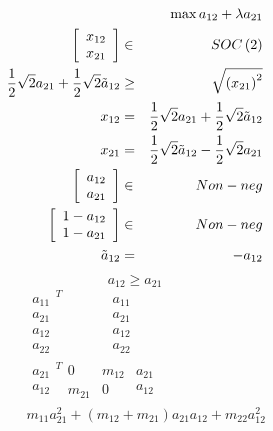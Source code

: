 \documentclass{article}
\begin{document}
\begin{eqnarray*}
&&\max a_{12}+\lambda a_{21} \\
\left[ 
\begin{array}{c}
x_{12} \\ 
x_{21}%
\end{array}%
\right]  &\in &SOC\left( 2\right)  \\
\frac{1}{2}\sqrt{2}a_{21}+\frac{1}{2}\sqrt{2}\tilde{a}_{12} &\geq &\sqrt{%
\left( x_{21}\right) ^{2}} \\
x_{12} &=&\frac{1}{2}\sqrt{2}a_{21}+\frac{1}{2}\sqrt{2}\tilde{a}_{12} \\
x_{21} &=&\frac{1}{2}\sqrt{2}\tilde{a}_{12}-\frac{1}{2}\sqrt{2}a_{21} \\
\left[ 
\begin{array}{c}
a_{12} \\ 
a_{21}%
\end{array}%
\right]  &\in &Non-neg \\
\left[ 
\begin{array}{c}
1-a_{12} \\ 
1-a_{21}%
\end{array}%
\right]  &\in &Non-neg \\
\tilde{a}_{12} &=&-a_{12}
\end{eqnarray*}
\[
a_{12}\geq a_{21}
\]%
\begin{eqnarray*}
&&%
\begin{array}{c}
a_{11} \\ 
a_{21} \\ 
a_{12} \\ 
a_{22}%
\end{array}%
^{T}%
\begin{array}{cccc}
&  &  &  \\ 
&  &  &  \\ 
&  &  &  \\ 
&  &  & 
\end{array}%
\begin{array}{c}
a_{11} \\ 
a_{21} \\ 
a_{12} \\ 
a_{22}%
\end{array}
\\
&&%
\begin{array}{c}
a_{21} \\ 
a_{12}%
\end{array}%
^{T}%
\begin{array}{cc}
0 & m_{12} \\ 
m_{21} & 0%
\end{array}%
\begin{array}{c}
a_{21} \\ 
a_{12}%
\end{array}
\\
&&m_{11}a_{21}^{2}+\left( m_{12}+m_{21}\right) a_{21}a_{12}+m_{22}a_{12}^{2}
\end{eqnarray*}%
\end{document}

